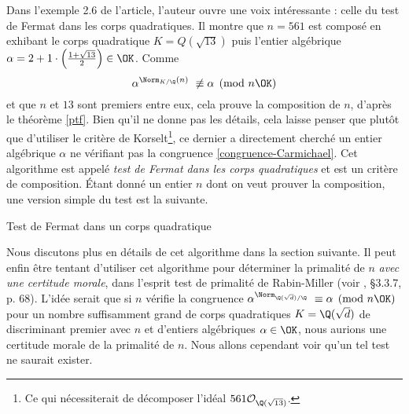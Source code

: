 Dans l'exemple 2.6 de l'article, l'auteur ouvre une voix intéressante : celle du test de Fermat dans les corps quadratiques. Il montre que $n = 561$ est composé en exhibant le corps quadratique $K = Q(\sqrt{13})$ puis l'entier algébrique $\alpha = 2 + 1\cdot \left(\frac{1 + \sqrt{13}}{2}\right) \in \OK$. Comme $$\alpha^{\Norm_{K/\Q}(n)} \not \equiv \alpha \pmod{n\OK}$$ et que $n$ et $13$ sont premiers entre eux, cela prouve la composition de $n$, d'après le théorème \ref{ptf}. Bien qu'il ne donne pas les détails, cela laisse penser que plutôt que d'utiliser le critère de Korselt\footnote{Ce qui nécessiterait de décomposer l'idéal $561\mathcal{O}_{\Q(\sqrt{13})}$.}, ce dernier a directement cherché un entier algébrique $\alpha$ ne vérifiant pas la congruence \ref{congruence-Carmichael}. Cet algorithme est appelé \emph{test de Fermat dans les corps quadratiques} et est un critère de composition. Étant donné un entier $n$ dont on veut prouver la composition, une version simple du test est la suivante.

\vspace{1em}
\begin{algorithm}[H]\label{test-Fermat-quadratique}
\caption{Test de Fermat dans un corps quadratique}
\end{algorithm}
\vspace{1em}

Nous discutons plus en détails de cet algorithme dans la section suivante. Il peut enfin être tentant d'utiliser cet algorithme pour déterminer la primalité de $n$ \emph{avec une certitude morale}, dans l'esprit test de primalité de Rabin-Miller (voir \cite{Demazure}, §3.3.7, p. 68). L'idée serait que si $n$ vérifie la congruence $\alpha^{\Norm_{\Q(\sqrt{d})/\Q}} \equiv \alpha \pmod{n\OK}$ pour un nombre suffisamment grand de corps quadratiques $K = \Q(\sqrt{d})$ de discriminant premier avec $n$ et d'entiers algébriques $\alpha \in \OK$, nous aurions une certitude morale de la primalité de $n$. Nous allons cependant voir qu'un tel test ne saurait exister. \\

